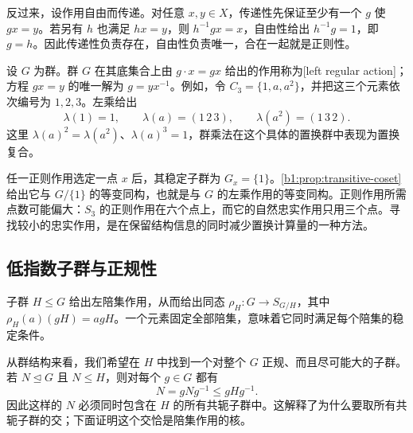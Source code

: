 \ProseParagraphBreak
反过来，设作用自由而传递。对任意 \(x,y\in X\)，传递性先保证至少有一个 \(g\) 使 \(gx=y\)。若另有 \(h\) 也满足 \(hx=y\)，则 \(h^{-1}gx=x\)，自由性给出 \(h^{-1}g=1\)，即 \(g=h\)。因此传递性负责存在，自由性负责唯一，合在一起就是正则性。

\ProseParagraphBreak
设 \(G\) 为群。群 \(G\) 在其底集合上由 \(g\cdot x=gx\) 给出的作用称为[left regular action]；方程 \(gx=y\) 的唯一解为 \(g=yx^{-1}\)。例如，令 \(C_3=\{1,a,a^2\}\)，并把这三个元素依次编号为 \(1,2,3\)。左乘给出
\[
	\lambda(1)=1,\qquad \lambda(a)=(1\,2\,3),\qquad \lambda(a^2)=(1\,3\,2).
\]
这里 \(\lambda(a)^2=\lambda(a^2)\)、\(\lambda(a)^3=1\)，群乘法在这个具体的置换群中表现为置换复合。

\ProseParagraphBreak
任一正则作用选定一点 \(x\) 后，其稳定子群为 \(G_x=\{1\}\)。\cref{b1:prop:transitive-coset}给出它与 \(G/\{1\}\) 的等变同构，也就是与 \(G\) 的左乘作用的等变同构。正则作用所需点数可能偏大：\(S_3\) 的正则作用在六个点上，而它的自然忠实作用只用三个点。寻找较小的忠实作用，是在保留结构信息的同时减少置换计算量的一种方法。

\subsection{低指数子群与正规性}
\label{b1:subsec:0404:02}

子群 \(H\leq G\) 给出左陪集作用，从而给出同态 \(\rho_H:G\rightarrow S_{G/H}\)，其中 \(\rho_H(a)(gH)=agH\)。一个元素固定全部陪集，意味着它同时满足每个陪集的稳定条件。

\ProseParagraphBreak
从群结构来看，我们希望在 \(H\) 中找到一个对整个 \(G\) 正规、而且尽可能大的子群。若 \(N\trianglelefteq G\) 且 \(N\leq H\)，则对每个 \(g\in G\) 都有
\[
	N=gNg^{-1}\leq gHg^{-1}.
\]
因此这样的 \(N\) 必须同时包含在 \(H\) 的所有共轭子群中。这解释了为什么要取所有共轭子群的交；下面证明这个交恰是陪集作用的核。

